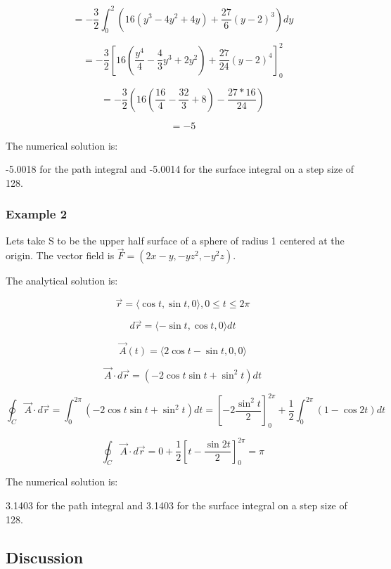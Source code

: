 \documentclass[12pt]{article}
\begin{document}
\[
    = - \frac{3}{2} \int_0^2 {\left(16 \left(y^3-4y^2+4y\right) + \frac{27}{6} {\left(y - 2\right)}^3\right) } dy
\]

\[
    = - \frac{3}{2} {\left[16 \left(\frac{y^4}{4}-\frac{4}{3}y^3+2y^2\right) + \frac{27}{24} {\left(y - 2\right)}^4\right] }_0^2
\]

\[
    = - \frac{3}{2} \left(16 \left(\frac{16}{4}-\frac{32}{3}+8\right) - \frac{27*16}{24}\right)
\]

\[
    = - 5
\]

The numerical solution is:

-5.0018 for the path integral and -5.0014 for the surface integral on a step size of 128.

\subsubsection{Example 2}

Lets take S to be the upper half surface of a sphere of radius 1 centered at the origin. The vector field is \(\vec{F} = \left(2x-y, -yz^2, -y^2z\right)\).

The analytical solution is:

\[
    \vec{r}=\langle\cos t, \sin t, 0\rangle, 0 \leq t \leq 2 \pi
\]

\[
    d \vec{r}=\langle-\sin t, \cos t, 0\rangle d t
\]

\[
    \vec{A}(t)=\langle 2 \cos t-\sin t, 0,0\rangle
\]

\[
    \vec{A} \cdot d \vec{r}=\left(-2 \cos t \sin t+\sin ^2 t\right) d t
\]

\[
    \oint_C \vec{A} \cdot d \vec{r}=\int_0^{2 \pi}\left(-2 \cos t \sin t+\sin ^2 t\right) d t=\left[-2 \frac{\sin ^2 t}{2}\right]_0^{2 \pi}+\frac{1}{2} \int_0^{2 \pi}(1-\cos 2 t) d t
\]

\[
    \oint_C \vec{A} \cdot d \vec{r}=0+\frac{1}{2}\left[t-\frac{\sin 2 t}{2}\right]_0^{2 \pi}=\pi
\]

The numerical solution is:

3.1403 for the path integral and 3.1403 for the surface integral on a step size of 128.

\subsection{Discussion}
\end{document}
